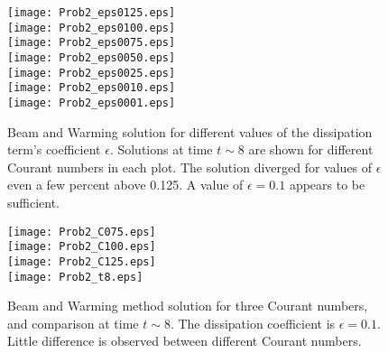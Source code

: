 \documentclass[11pt]{article}
\begin{document}
\begin{figure}[h!]
\begin{center}
\texttt{[image: Prob2\_eps0125.eps]} \vspace*{-0.5cm} \\
\texttt{[image: Prob2\_eps0100.eps]} \vspace*{-0.5cm} \\
\texttt{[image: Prob2\_eps0075.eps]} \vspace*{-0.5cm} \\
\texttt{[image: Prob2\_eps0050.eps]} \vspace*{-0.5cm} \\
\texttt{[image: Prob2\_eps0025.eps]} \vspace*{-0.5cm} \\
\texttt{[image: Prob2\_eps0010.eps]} \vspace*{-0.5cm} \\
\texttt{[image: Prob2\_eps0001.eps]}
\\[0.5cm]
\caption{Beam and Warming solution for different values of the dissipation term's coefficient $\epsilon$. Solutions at time $t \sim 8$ are shown for different Courant numbers in each plot. The solution diverged for values of $\epsilon$ even a few percent above 0.125. A value of $\epsilon=0.1$ appears to be sufficient.}
\label{fig:BeamWarming_Epsilon}
\end{center}
\end{figure}

\begin{figure}[h!]
\begin{center}
\texttt{[image: Prob2\_C075.eps]} \\
\texttt{[image: Prob2\_C100.eps]} \\
\texttt{[image: Prob2\_C125.eps]} \\
\texttt{[image: Prob2\_t8.eps]}
\\[0.5cm]
\caption{Beam and Warming method solution for three Courant numbers, and comparison at time $t \sim 8$. The dissipation coefficient is $\epsilon = 0.1$. Little difference is observed between different Courant numbers.}
\label{fig:MacCormack}
\end{center}
\end{figure}

\end{document}
